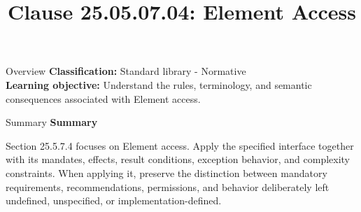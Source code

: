 \documentclass[10pt,letterpaper]{article}
\title{Clause 25.05.07.04: Element Access}
\author{}
\date{}
\begin{document}
\maketitle
\begin{CornellOverviewBox}{Overview}
\textbf{Classification:} Standard library - Normative\\[2pt]
\textbf{Learning objective:} Understand the rules, terminology, and semantic consequences associated with Element access.
\end{CornellOverviewBox}\begin{CornellSummaryBox}{Summary}
{\sffamily\bfseries\color{Accent} Summary}\par\vspace{3pt}Section 25.5.7.4 focuses on Element access. Apply the specified interface together with its mandates, effects, result conditions, exception behavior, and complexity constraints. When applying it, preserve the distinction between mandatory requirements, recommendations, permissions, and behavior deliberately left undefined, unspecified, or implementation-defined.
\end{CornellSummaryBox}
\end{document}
